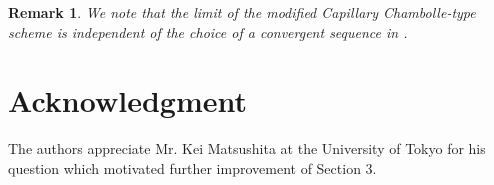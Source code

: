 \documentclass[11pt]{article}
\makeatletter
\numberwithin{equation}{section}
\newtheorem{remark}[theorem]{Remark}
\newcommand{\pOmega}[0]{\partial\Omega}
\newcommand{\fix}[1]{\textcolor{red}{#1}}
\newcounter{mathrecordid}
\newcommand{\mathboxbegin}[1]{%
  \stepcounter{mathrecordid}%
  \immediate\write\mathrecords{\themathrecordid,#1}%
  \special{pdf:bann << /Type /Annot /Subtype /Link /Border [0 0 0]
    /MathBoxID \themathrecordid /F 2
    /A << /S /URI /URI (urn:mathbox:\themathrecordid) >> >>}}
\newcommand{\mathboxinlineplain}[1]{$#1$}
\newcommand{\mathboxinline}[1]{%
  $\mathboxbegin{inline}#1\special{pdf:eann}$}
\newcommand{\recordmath}{%
  \ifmeasuring@\expandafter\mathboxinlineplain
  \else\expandafter\mathboxinline\fi}
\makeatother
\begin{document}
\begin{remark}
We note that the limit of the modified Capillary Chambolle-type scheme is independent of the choice of a convergent sequence \recordmath{\beta^h \to \beta} in \recordmath{C^0(\pOmega)}.
\end{remark}


\section*{Acknowledgment} The authors appreciate Mr. Kei Matsushita at the University of Tokyo for his question which motivated further improvement of Section 3.



\end{document}
